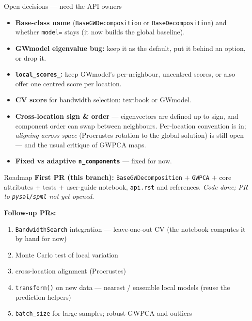 \documentclass[10pt]{beamer}
\begin{document}
\begin{frame}{Open decisions --- need the API owners}
  \begin{itemize}
    \item \textbf{Base-class name} (\texttt{BaseGWDecomposition} or
      \texttt{BaseDecomposition}) and whether \texttt{model=} stays (it now
      builds the global baseline).
    \item \textbf{GWmodel eigenvalue bug:} keep it as the default, put it
      behind an option, or drop it.
    \item \textbf{\texttt{local\_scores\_}:} keep GWmodel's per-neighbour,
      uncentred scores, or also offer one centred score per location.
    \item \textbf{CV score} for bandwidth selection: textbook or GWmodel.
    \item \textbf{Cross-location sign \& order} --- eigenvectors are defined
      up to sign, and component order can swap between neighbours.
      Per-location convention is in; \emph{aligning across space} (Procrustes
      rotation to the global solution) is still open --- and the usual
      critique of GWPCA maps.
    \item \textbf{Fixed vs adaptive \texttt{n\_components}} --- fixed for now.
  \end{itemize}
\end{frame}

\begin{frame}{Roadmap}
  \textbf{First PR (this branch):} \texttt{BaseGWDecomposition} $+$
  \texttt{GWPCA} $+$ core attributes $+$ tests $+$ user-guide notebook,
  \texttt{api.rst} and references. \emph{Code done; PR to
  \texttt{pysal/spml} not yet opened.}
  \vspace{0.6em}

  \textbf{Follow-up PRs:}
  \begin{enumerate}
    \item \texttt{BandwidthSearch} integration --- leave-one-out CV
      (the notebook computes it by hand for now)
    \item Monte Carlo test of local variation
    \item cross-location alignment (Procrustes)
    \item \texttt{transform()} on new data --- nearest / ensemble local
      models (reuse the prediction helpers)
    \item \texttt{batch\_size} for large samples; robust GWPCA and outliers
  \end{enumerate}
\end{frame}
\end{document}
